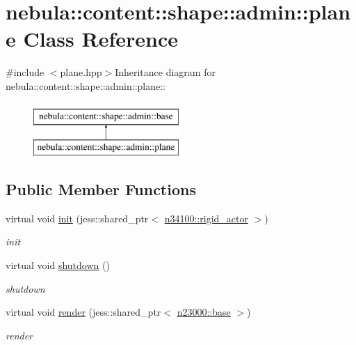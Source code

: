 \hypertarget{classnebula_1_1content_1_1shape_1_1admin_1_1plane}{
\section{nebula::content::shape::admin::plane Class Reference}
\label{classnebula_1_1content_1_1shape_1_1admin_1_1plane}
}


{\ttfamily \#include $<$plane.hpp$>$}Inheritance diagram for nebula::content::shape::admin::plane::\begin{figure}[H]
\begin{center}
\leavevmode
\includegraphics[height=2cm]{classnebula_1_1content_1_1shape_1_1admin_1_1plane}
\end{center}
\end{figure}
\subsection*{Public Member Functions}
\begin{DoxyCompactItemize}
\item 
virtual void \hyperlink{classnebula_1_1content_1_1shape_1_1admin_1_1plane_a6d4175d9e25c15ed2d4f07c0ba7ccb2e}{init} (jess::shared\_\-ptr$<$ \hyperlink{classnebula_1_1content_1_1actor_1_1admin_1_1rigid__actor}{n34100::rigid\_\-actor} $>$)
\begin{DoxyCompactList}\small\item\em init \item\end{DoxyCompactList}\item 
virtual void \hyperlink{classnebula_1_1content_1_1shape_1_1admin_1_1plane_ac713ec10355d797e07aabad0c4ebd32b}{shutdown} ()
\begin{DoxyCompactList}\small\item\em shutdown \item\end{DoxyCompactList}\item 
virtual void \hyperlink{classnebula_1_1content_1_1shape_1_1admin_1_1plane_af70061ee4169a4f2abc40d43e6b6ea7c}{render} (jess::shared\_\-ptr$<$ \hyperlink{classnebula_1_1platform_1_1renderer_1_1base}{n23000::base} $>$)
\begin{DoxyCompactList}\small\item\em render \item\end{DoxyCompactList}\end{DoxyCompactItemize}



